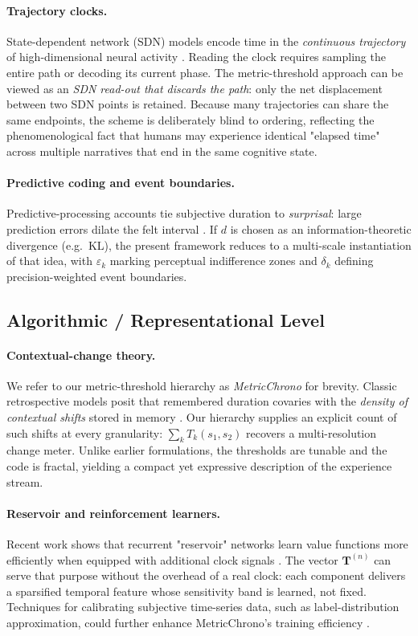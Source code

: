 \documentclass[preprint,11pt]{elsarticle}
\begin{document}
\paragraph{Trajectory clocks.}
State-dependent network (SDN) models encode time in the
\emph{continuous trajectory} of high-dimensional neural activity
\citep{buonomano2009}.  Reading the clock requires sampling the entire
path or decoding its current phase.  The metric-threshold approach can
be viewed as an \emph{SDN read-out that discards the path}: only the
net displacement between two SDN points is retained.  Because many
trajectories can share the same endpoints, the scheme is deliberately
blind to ordering, reflecting the phenomenological fact that humans may
experience identical "elapsed time" across multiple narratives that
end in the same cognitive state.

\paragraph{Predictive coding and event boundaries.}
Predictive-processing accounts tie subjective duration to
\emph{surprisal}: large prediction errors dilate the felt interval
\citep{friston2010free,zacks2007event}.  If $d$ is chosen as an
information-theoretic divergence (e.g.\ KL), the present framework
reduces to a multi-scale instantiation of that idea, with $\varepsilon_k$
marking perceptual indifference zones and $\delta_k$ defining
precision-weighted event boundaries.

\subsection{Algorithmic / Representational Level}
\paragraph{Contextual-change theory.}
We refer to our metric-threshold hierarchy as \emph{MetricChrono} for brevity.
Classic retrospective models posit that remembered duration covaries
with the \emph{density of contextual shifts} stored in memory
\citep{block1990distinguishing}.  Our hierarchy supplies an explicit
count of such shifts at every granularity:
$\sum_k T_k(s_1,s_2)$ recovers a multi-resolution change
meter.  Unlike earlier formulations, the thresholds are tunable and the
code is fractal, yielding a compact yet expressive description of the
experience stream.

\paragraph{Reservoir and reinforcement learners.}
Recent work shows that recurrent "reservoir" networks learn value
functions more efficiently when equipped with additional clock signals
\citep{merchant2013neurophysiology}. The vector
$\mathbf T^{(n)}$ can serve that purpose without the overhead of a real
clock: each component delivers a sparsified temporal feature whose
sensitivity band is learned, not fixed. Techniques for calibrating
subjective time-series data, such as label-distribution approximation,
could further enhance MetricChrono's training efficiency \citep{Liang2023}.
\end{document}
